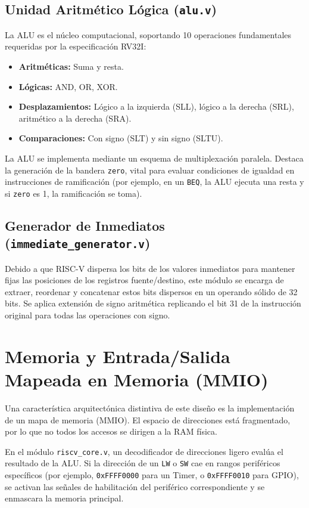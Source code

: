 \subsection{Unidad Aritmético Lógica (\texttt{alu.v})}
La ALU es el núcleo computacional, soportando 10 operaciones fundamentales requeridas por la especificación RV32I:
\begin{itemize}
    \item \textbf{Aritméticas:} Suma y resta.
    \item \textbf{Lógicas:} AND, OR, XOR.
    \item \textbf{Desplazamientos:} Lógico a la izquierda (SLL), lógico a la derecha (SRL), aritmético a la derecha (SRA).
    \item \textbf{Comparaciones:} Con signo (SLT) y sin signo (SLTU).
\end{itemize}



La ALU se implementa mediante un esquema de multiplexación paralela. Destaca la generación de la bandera \texttt{zero}, vital para evaluar condiciones de igualdad en instrucciones de ramificación (por ejemplo, en un \texttt{BEQ}, la ALU ejecuta una resta y si \texttt{zero} es 1, la ramificación se toma).

\subsection{Generador de Inmediatos (\texttt{immediate\_generator.v})}
Debido a que RISC-V dispersa los bits de los valores inmediatos para mantener fijas las posiciones de los registros fuente/destino, este módulo se encarga de extraer, reordenar y concatenar estos bits dispersos en un operando sólido de 32 bits. Se aplica extensión de signo aritmética replicando el bit 31 de la instrucción original para todas las operaciones con signo.

\section{Memoria y Entrada/Salida Mapeada en Memoria (MMIO)}
\label{sec:MMIO}

Una característica arquitectónica distintiva de este diseño es la implementación de un mapa de memoria (MMIO). El espacio de direcciones está fragmentado, por lo que no todos los accesos se dirigen a la RAM física.

En el módulo \texttt{riscv\_core.v}, un decodificador de direcciones ligero evalúa el resultado de la ALU. Si la dirección de un \texttt{LW} o \texttt{SW} cae en rangos periféricos específicos (por ejemplo, \texttt{0xFFFF0000} para un Timer, o \texttt{0xFFFF0010} para GPIO), se activan las señales de habilitación del periférico correspondiente y se enmascara la memoria principal.



